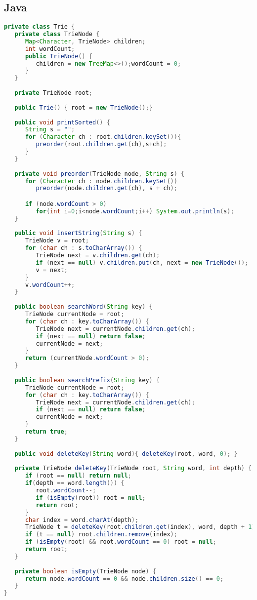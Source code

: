 \subsection{Java}
\begin{lstlisting}[language=Java]
private class Trie {
   private class TrieNode {
      Map<Character, TrieNode> children;
      int wordCount;
      public TrieNode() {
         children = new TreeMap<>();wordCount = 0;
      }
   }
   
   private TrieNode root;
	
   public Trie() { root = new TrieNode();}
	
   public void printSorted() {
      String s = "";
      for (Character ch : root.children.keySet()){
         preorder(root.children.get(ch),s+ch);
      }
   }
	
   private void preorder(TrieNode node, String s) {
      for (Character ch : node.children.keySet()) 
         preorder(node.children.get(ch), s + ch);

      if (node.wordCount > 0) 
         for(int i=0;i<node.wordCount;i++) System.out.println(s);
   }
	
   public void insertString(String s) {
      TrieNode v = root;
      for (char ch : s.toCharArray()) {
         TrieNode next = v.children.get(ch);
         if (next == null) v.children.put(ch, next = new TrieNode());
         v = next;
      }
      v.wordCount++;
   }
	
   public boolean searchWord(String key) {
      TrieNode currentNode = root;
      for (char ch : key.toCharArray()) {
         TrieNode next = currentNode.children.get(ch);
         if (next == null) return false;
         currentNode = next;
      }
      return (currentNode.wordCount > 0);
   }
	
   public boolean searchPrefix(String key) {
      TrieNode currentNode = root;
      for (char ch : key.toCharArray()) {
         TrieNode next = currentNode.children.get(ch);
         if (next == null) return false;
         currentNode = next;
      }
      return true;
   }
	
   public void deleteKey(String word){ deleteKey(root, word, 0); }
	
   private TrieNode deleteKey(TrieNode root, String word, int depth) {
      if (root == null) return null;
      if(depth == word.length()) {
         root.wordCount--;
         if (isEmpty(root)) root = null;
         return root;
      }
      char index = word.charAt(depth);
      TrieNode t = deleteKey(root.children.get(index), word, depth + 1);
      if (t == null) root.children.remove(index);
      if (isEmpty(root) && root.wordCount == 0) root = null;
      return root;
   }
	
   private boolean isEmpty(TrieNode node) {
      return node.wordCount == 0 && node.children.size() == 0;
   }
}
\end{lstlisting}